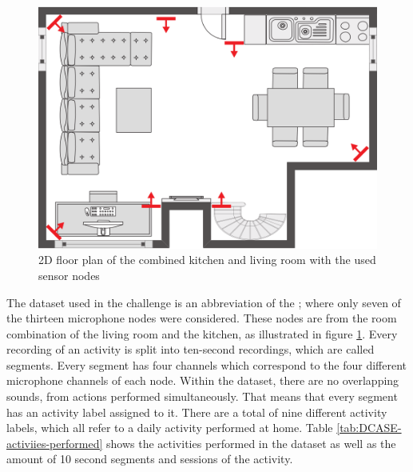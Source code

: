 \begin{figure}[htbp]
	\centering
	\includegraphics[scale=0.8]{baa-documentation/img/DCASE_floor_map.png}
	\caption[2D floor plan of the combined kitchen and living room with the used sensor nodes]{2D floor plan of the combined kitchen and living room with the used sensor nodes \footnotemark}
	\label{fig:dcase-recordings-floor-plan}
\end{figure}
\noindent
The dataset used in the challenge is an abbreviation of the ; where only seven of the thirteen microphone nodes were considered. These nodes are from the room combination of the living room and the kitchen, as illustrated in figure \ref{fig:dcase-recordings-floor-plan}. Every recording of an activity is split into ten-second recordings, which are called segments. Every segment has four channels which correspond to the four different microphone channels of each node. Within the dataset, there are no overlapping sounds, from actions performed simultaneously. That means that every segment has an activity label assigned to it. There are a total of nine different activity labels, which all refer to a daily activity performed at home. Table \ref{tab:DCASE-activiies-performed} shows the activities performed in the dataset as well as the amount of 10 second segments and sessions of the activity.

